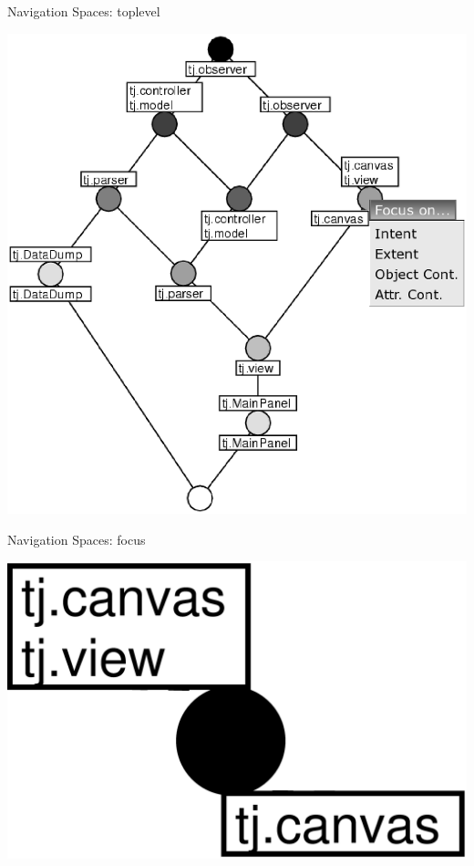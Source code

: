 \documentclass[pdf,prettybox]{prosper}
\begin{document}
\begin{slide}{Navigation Spaces: toplevel}
 \begin{center}
  \includegraphics[height=0.8 \textheight]{img/callgraph-1.eps}
 \end{center}
\end{slide}

\begin{slide}{Navigation Spaces: focus}
 \begin{center}
  \includegraphics[height=0.8 \textheight]{img/callgraph-2.eps}
 \end{center}
\end{slide}
\end{document}

